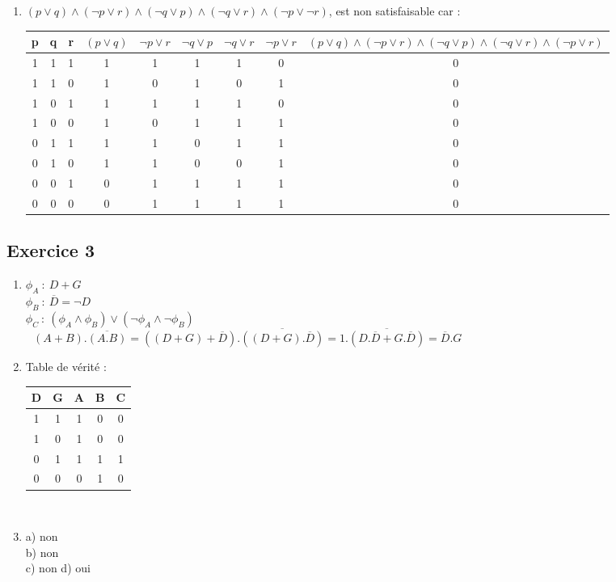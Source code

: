 \documentclass[a4paper, draft]{article}
\begin{document}
\begin{enumerate}
  \item $(p\lor q) \land (\lnot p \lor r ) \land ( \lnot q \lor p  ) \land ( \lnot q \lor r  ) \land ( \lnot p \lor \lnot r )$, est non satisfaisable car :\\
    \begin{tabular}
      {|c c c|c|c|c|c|c|c|}
      \hline
      p&q&r&$(p\lor q)$&$\lnot p \lor r$&$\lnot q \lor p$&$\lnot q \lor r$&$\lnot p \lor r$&$(p\lor q)\land (\lnot p \lor r)\land(\lnot q \lor p)\land(\lnot q \lor r)\land(\lnot p \lor r)$\\
      \hline
      1&1&1&1&1&1&1&0&0\\
      1&1&0&1&0&1&0&1&0\\
      1&0&1&1&1&1&1&0&0\\
      1&0&0&1&0&1&1&1&0\\
      0&1&1&1&1&0&1&1&0\\
      0&1&0&1&1&0&0&1&0\\
      0&0&1&0&1&1&1&1&0\\
      0&0&0&0&1&1&1&1&0\\
      \hline
    \end{tabular}

\end{enumerate}
\subsection*{Exercice 3}
\begin{enumerate}
  \item $\phi_{A} \ : \ D + G$ \\
    $\phi_{B} \ : \ \overline{ D} = \lnot D$ \\
    $\phi_{C} \ : \ (\phi_{A}\land\phi_{B}) \lor (\lnot\phi_{A}\land\lnot\phi_{B})$\\
    $\text{   }(A+B).\overline{(A.B)}=((D+G)+\overline{D}).\overline{((D+G).\overline{D})}=1.\overline{(D.\overline{D}+G.\overline{D})}=\overline{D}.G$\\

  \item Table de vérité :\\

    \begin{tabular}
          {|c c|c|c|c|}
          \hline
          D&G&A&B&C\\
          \hline
          1&1&1&0&0\\
          1&0&1&0&0\\
          0&1&1&1&1\\
          0&0&0&1&0\\
          \hline

    \end{tabular}\\

  \item a) non\\
    b) non\\
    c) non
    d) oui
\end{enumerate}
\end{document}
